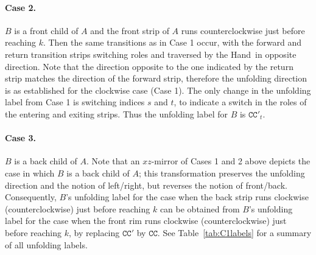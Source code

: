 \documentclass[11pt]{article}
\def\cc{\mathtt{CC}}
\newcommand\hand{{\sc Hand}}
\begin{document}
\paragraph{Case 2.} $B$ is a front child of $A$ and the front strip of $A$ runs counterclockwise just before reaching $k$. Then the same transitions as in Case 1 occur, with the forward and return transition strips switching roles and traversed by the \hand\ in opposite direction. Note that the direction opposite to the one indicated by the return strip matches the direction of the forward strip, therefore the unfolding direction is as established for the clockwise case (Case 1). The only change in the unfolding label from Case 1 is switching indices $s$ and $t$, to indicate a switch in the roles of the entering and exiting strips. Thus the unfolding label for $B$ is $\cc'_{t}$. 

\paragraph{Case 3.} $B$ is a back child of $A$. Note that an $xz$-mirror of Cases 1 and 2 above depicts the case in which $B$ is a back child of $A$; this transformation preserves the unfolding direction and the notion of left/right, but reverses the notion of front/back. 
Consequently, $B$'s unfolding label for the case when the back strip runs clockwise (counterclockwise) just before reaching $k$ can be obtained from $B$'s unfolding label for the case when the front rim runs clockwise (counterclockwise) just before reaching $k$, by replacing $\cc'$ by $\cc$. See Table~\ref{tab:C1labels} for a summary of all unfolding labels.
\end{document}
